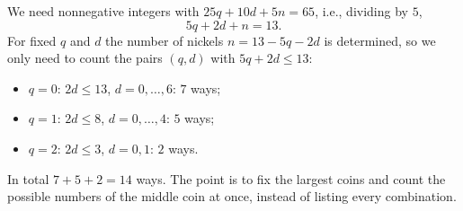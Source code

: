 We need nonnegative integers with $25q+10d+5n=65$, i.e., dividing by $5$,
\[
5q+2d+n=13 .
\]
For fixed $q$ and $d$ the number of nickels $n=13-5q-2d$ is determined, so we only need to count the pairs $(q,d)$ with $5q+2d\le13$:
\begin{itemize}
\item $q=0$: $2d\le13$, $d=0,\dots,6$: $7$ ways;
\item $q=1$: $2d\le8$, $d=0,\dots,4$: $5$ ways;
\item $q=2$: $2d\le3$, $d=0,1$: $2$ ways.
\end{itemize}
In total $7+5+2=\boxed{14}$ ways. The point is to fix the largest coins and count the possible numbers of the middle coin at once, instead of listing every combination.
